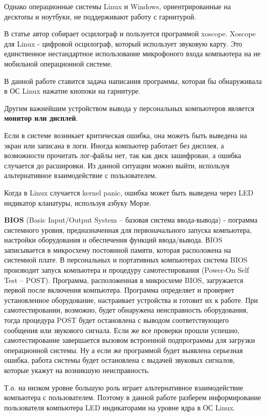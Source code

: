 Однако операционные системы Linux и Windows, ориентрированные на десктопы и ноутбуки, не поддерживают работу с гарнитурой. 

В статье \cite{gambiarraemcasa} автор собирает осцилограф и пользуется программой xoscope. Xoscope для Linux - цифровой осцилограф, который использует звуковую карту. Это единственное нестандартное использование микрофоного входа компьютера на не мобильной операционной системе.

В данной работе ставится задача написания программы, которая бы обнаруживала в ОС Linux нажатие кнопоки на гарнитуре.  

Другим важнейшим устройством вывода у персональных компьютеров является \textbf{монитор или дисплей}.

Если в системе возникает критическая ошибка, она можеть быть выведена на экран или записана в логи. Иногда компьютер работает без дисплея, а возможности прочитать лог-файлы нет, так как диск зашифрован, а ошибка случается до расшировки. Из данной ситуации можно выйти, используя альтернативное взаимодействие с пользователем.

Когда в Linux случается kernel panic, ошибка может быть выведена через LED индикатор клаиатуры, используя азбуку Морзе. \cite{lwn-mckp}

\textbf{BIOS} (Basic Input/Output System – базовая система ввода-вывода) - пограмма системного уровня, предназначенная для первоначального запуска компьютера, настройки оборудования и обеспечения функций ввода/вывода. ВIOS записывается в микросхему постоянной памяти, которая расположена на системной плате. В персональных и портативных компьютерах система BIOS производит запуск компьютера и процедуру самотестирования (Power-On Self Test – POST). Программа, расположенная в микросхеме BIOS, загружается первой после включения компьютера. Программа определяет и проверяет установленное оборудование, настраивает устройства и готовит их к работе. При самотестировании, возможно, будет обнаружена неисправность оборудования, тогда процедура POST будет остановлена с выводом соответствующего сообщения или звукового сигнала. Если же все проверки прошли успешно, самотестирование завершается вызовом встроенной подпрограммы для загрузки операционной системы. Ну а если же программой будет выявлена серьезная ошибка, работа системы будет остановлена с выдачей звуковых сигналов, которые укажут на возникшую неисправность. \cite{allmbs-bios}

Т.о. на низком уровне большую роль играет альтернативное взаимодействие компьютера с пользователем. Поэтому в данной работе разберем информирование пользователя компьютера LED индикаторами на уровне ядра в ОС Linux.

